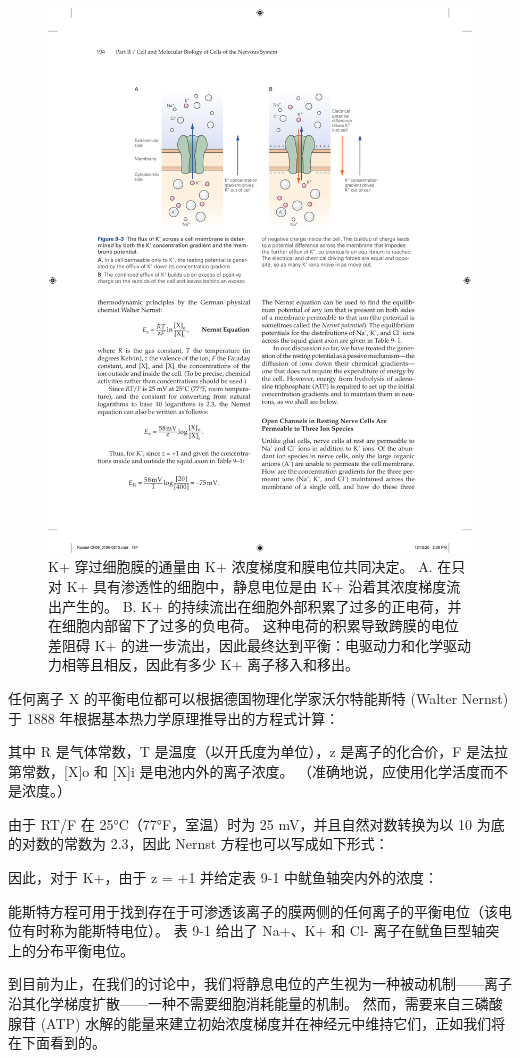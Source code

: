 \begin{figure}[htbp]
	\centering
	\includegraphics[width=0.7\linewidth]{chap09/fig_9_3}
	\caption{K+ 穿过细胞膜的通量由 K+ 浓度梯度和膜电位共同决定。 A. 在只对 K+ 具有渗透性的细胞中，静息电位是由 K+ 沿着其浓度梯度流出产生的。 B. K+ 的持续流出在细胞外部积累了过多的正电荷，并在细胞内部留下了过多的负电荷。 这种电荷的积累导致跨膜的电位差阻碍 K+ 的进一步流出，因此最终达到平衡：电驱动力和化学驱动力相等且相反，因此有多少 K+ 离子移入和移出。}
	\label{fig:9_3}
\end{figure}


任何离子 X 的平衡电位都可以根据德国物理化学家沃尔特能斯特 (Walter Nernst) 于 1888 年根据基本热力学原理推导出的方程式计算：


其中 R 是气体常数，T 是温度（以开氏度为单位），z 是离子的化合价，F 是法拉第常数，[X]o 和 [X]i 是电池内外的离子浓度。 
（准确地说，应使用化学活度而不是浓度。）


由于 RT/F 在 25°C（77°F，室温）时为 25 mV，并且自然对数转换为以 10 为底的对数的常数为 2.3，因此 Nernst 方程也可以写成如下形式：


因此，对于 K+，由于 z = +1 并给定表 9-1 中鱿鱼轴突内外的浓度：


能斯特方程可用于找到存在于可渗透该离子的膜两侧的任何离子的平衡电位（该电位有时称为能斯特电位）。 
表 9-1 给出了 Na+、K+ 和 Cl- 离子在鱿鱼巨型轴突上的分布平衡电位。


到目前为止，在我们的讨论中，我们将静息电位的产生视为一种被动机制——离子沿其化学梯度扩散——一种不需要细胞消耗能量的机制。 
然而，需要来自三磷酸腺苷 (ATP) 水解的能量来建立初始浓度梯度并在神经元中维持它们，正如我们将在下面看到的。




